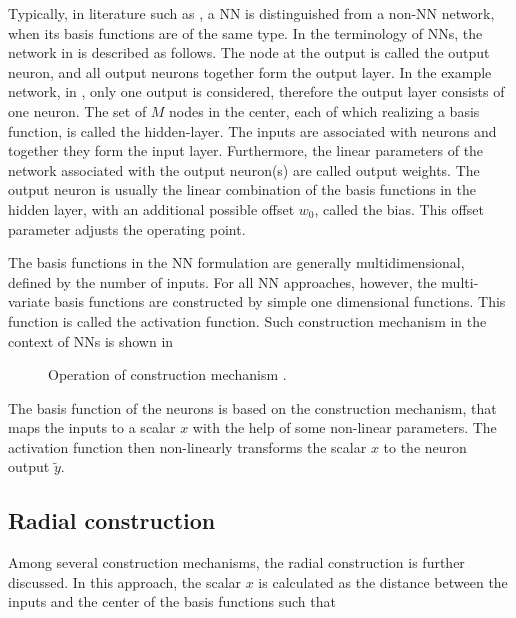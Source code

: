 Typically, in literature such as \cite{nelles2013nonlinear, norgaard2003neural}, a NN is distinguished from a non-NN network, when its basis functions are of the same type. In the terminology of NNs, the network in  is described as follows. The node at the output is called the output neuron, and all output neurons together form the output layer. In the example network, in , only one output is considered, therefore the output layer consists of one neuron. The set of $M$ nodes in the center, each of which realizing a basis function, is called the hidden-layer. The inputs are associated with neurons and together they form the input layer. Furthermore, the linear parameters of the network associated with the output neuron(s) are called output weights. The output neuron is usually the linear combination of the basis functions in the hidden layer, with an additional possible offset $w_0$, called the bias. This offset parameter adjusts the operating point. 

The basis functions in the NN formulation are generally multidimensional, defined by the number of inputs. For all NN approaches, however, the multi-variate basis functions are constructed by simple one dimensional functions\cite{nelles2013nonlinear}. This function is called the activation function. Such construction mechanism in the context of NNs is shown in 

\begin{figure}[H]
\centering
 
\caption{Operation of construction mechanism \cite{nelles2013nonlinear}.}
\label{fig:activation_mechanism}
\end{figure}

\vspace{-3mm}

The basis function of the neurons is based on the construction mechanism, that maps the inputs to a scalar $x$ with the help of some non-linear parameters. The activation function then non-linearly transforms the scalar $x$ to the neuron output $\tilde{y}$. 

\subsection{Radial construction}
\label{radial construction}

Among several construction mechanisms, the radial construction is further discussed. In this approach, the scalar $x$ is calculated as the distance between the inputs and the center of the basis functions such that 

